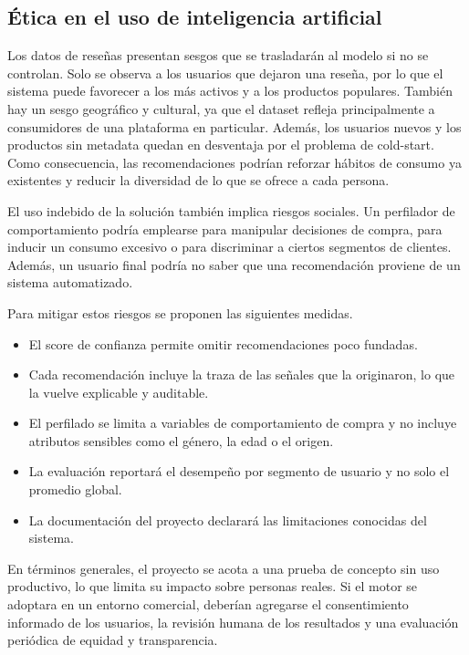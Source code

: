 \documentclass[
11pt, %
]{charter}
\begin{document}
\subsection{Ética en el uso de inteligencia artificial}

Los datos de reseñas presentan sesgos que se trasladarán al modelo si no se controlan. Solo se observa a los usuarios que dejaron una reseña, por lo que el sistema puede favorecer a los más activos y a los productos populares. También hay un sesgo geográfico y cultural, ya que el dataset refleja principalmente a consumidores de una plataforma en particular. Además, los usuarios nuevos y los productos sin metadata quedan en desventaja por el problema de cold-start. Como consecuencia, las recomendaciones podrían reforzar hábitos de consumo ya existentes y reducir la diversidad de lo que se ofrece a cada persona.

El uso indebido de la solución también implica riesgos sociales. Un perfilador de comportamiento podría emplearse para manipular decisiones de compra, para inducir un consumo excesivo o para discriminar a ciertos segmentos de clientes. Además, un usuario final podría no saber que una recomendación proviene de un sistema automatizado.

Para mitigar estos riesgos se proponen las siguientes medidas.

\begin{itemize}
  \item El score de confianza permite omitir recomendaciones poco fundadas.
  \item Cada recomendación incluye la traza de las señales que la originaron, lo que la vuelve explicable y auditable.
  \item El perfilado se limita a variables de comportamiento de compra y no incluye atributos sensibles como el género, la edad o el origen.
  \item La evaluación reportará el desempeño por segmento de usuario y no solo el promedio global.
  \item La documentación del proyecto declarará las limitaciones conocidas del sistema.
\end{itemize}

En términos generales, el proyecto se acota a una prueba de concepto sin uso productivo, lo que limita su impacto sobre personas reales. Si el motor se adoptara en un entorno comercial, deberían agregarse el consentimiento informado de los usuarios, la revisión humana de los resultados y una evaluación periódica de equidad y transparencia.
\end{document}
